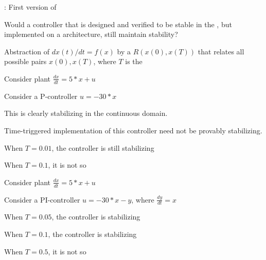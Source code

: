 \documentclass{seminar}
\begin{document}
\begin{slide}

{}: First version of {}

\medskip
{} 
Would a controller that is designed and verified to be stable
in the {}, but implemented on a
{} architecture, still maintain stability?

\medskip
{} 
Abstraction of $dx(t)/dt = f(x)$ by a {}
$R(x(0),x(T))$ that relates all possible pairs
$x(0),x(T)$, where $T$ is the {}

\end{slide}
\begin{slide}

Consider plant $\frac{dx}{dt} = 5*x + u$

Consider a P-controller $u = -30*x$

This is clearly stabilizing in the continuous domain.

Time-triggered implementation of this controller need
not be provably stabilizing.

When $T = 0.01$, the controller is still stabilizing

When $T = 0.1$, it is not so

\end{slide}
\begin{slide}

Consider plant $\frac{dx}{dt} = 5*x + u$

Consider a PI-controller $u = -30*x - y$,
where $\frac{dy}{dt} = x$

When $T = 0.05$, the controller is stabilizing

When $T = 0.1$, the controller is stabilizing

When $T = 0.5$, it is not so

\end{slide}
\begin{slide}

\end{slide}
\end{document}
